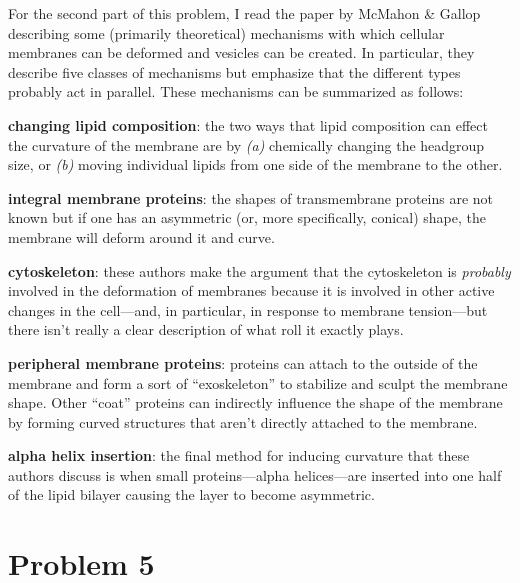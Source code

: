 \documentclass[12pt]{article}
\begin{document}
For the second part of this problem, I read the paper by McMahon \& Gallop
\cite{curvature} describing some (primarily theoretical) mechanisms with which
cellular membranes can be deformed and vesicles can be created.
In particular, they describe five classes of mechanisms but emphasize that
the different types probably act in parallel.
These mechanisms can be summarized as follows:
\begin{enumerate}

{\item {\bf changing lipid composition}:
the two ways that lipid composition can effect the curvature of the membrane
are by \emph{(a)} chemically changing the headgroup size, or \emph{(b)} moving
individual lipids from one side of the membrane to the other.}

{\item {\bf integral membrane proteins}:
the shapes of transmembrane proteins are not known but if one has an
asymmetric (or, more specifically, conical) shape, the membrane will deform
around it and curve.}

{\item {\bf cytoskeleton}:
these authors make the argument that the cytoskeleton is \emph{probably}
involved in the deformation of membranes because it is involved in other
active changes in the cell---and, in particular, in response to membrane
tension---but there isn't really a clear description of what roll it exactly
plays.}

{\item {\bf peripheral membrane proteins}:
proteins can attach to the outside of the membrane and form a sort of
``exoskeleton'' to stabilize and sculpt the membrane shape.
Other ``coat'' proteins can indirectly influence the shape of the membrane by
forming curved structures that aren't directly attached to the membrane.}

{\item {\bf alpha helix insertion}:
the final method for inducing curvature that these authors discuss is when
small proteins---alpha helices---are inserted into one half of the lipid
bilayer causing the layer to become asymmetric.}

\end{enumerate}




\section{Problem 5}
\end{document}
